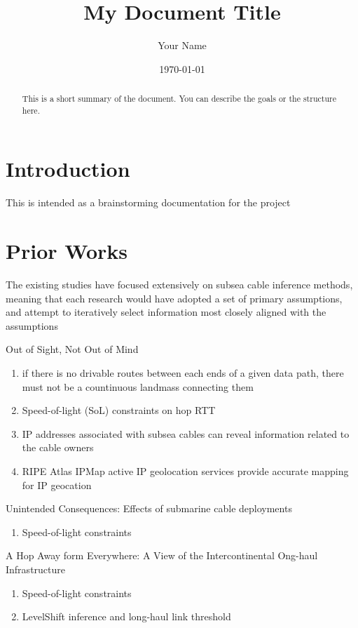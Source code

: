 \documentclass[twocolumn]{article}
\title{My Document Title}
\author{Your Name}
\date{\today}
\begin{document}
\maketitle

\begin{abstract}
This is a short summary of the document. You can describe the goals or the structure here.
\end{abstract}

\section{Introduction}
This is intended as a brainstorming documentation for the project

\section{Prior Works}
The existing studies have focused extensively on subsea cable inference methods,
meaning that each research would have adopted a set of primary assumptions,
and attempt to iteratively select information most closely aligned with the assumptions

Out of Sight, Not Out of Mind
\begin{enumerate}
    \item if there is no drivable routes between each ends of a given data path, there must not be a countinuous landmass connecting them
    \item Speed-of-light (SoL) constraints on hop RTT
    \item IP addresses associated with subsea cables can reveal information related to the cable owners
    \item RIPE Atlas IPMap active IP geolocation services provide accurate mapping for IP geocation
\end{enumerate}

Unintended Consequences: Effects of submarine cable deployments
\begin{enumerate}
    \item Speed-of-light constraints
\end{enumerate}
A Hop Away form Everywhere: A View of the Intercontinental Ong-haul Infrastructure
\begin{enumerate}
    \item Speed-of-light constraints
    \item LevelShift inference and long-haul link threshold
\end{enumerate}
\end{document}
